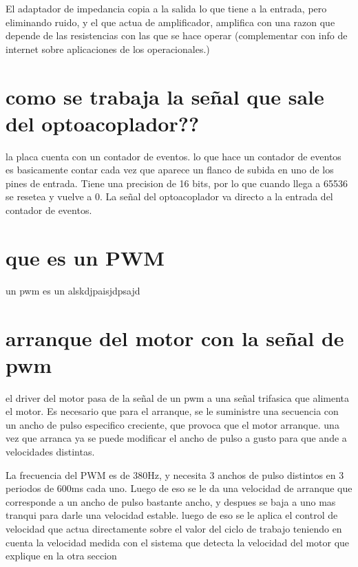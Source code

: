 \documentclass[a4paper]{article}
\begin{document}
El adaptador de impedancia copia a la salida lo que tiene a la entrada, pero eliminando ruido, y el que actua de amplificador, amplifica con una razon que depende de las resistencias con las que se hace operar (complementar con info de internet sobre aplicaciones de los operacionales.)

\section*{como se trabaja la señal que sale del optoacoplador??}
la placa cuenta con un contador de eventos. lo que hace un contador de eventos es basicamente contar cada vez que aparece un flanco de subida en uno de los pines de entrada. Tiene una precision de 16 bits, por lo que cuando llega a 65536 se resetea y vuelve a 0. La señal del optoacoplador va directo a la entrada del contador de eventos.

\section*{que es un PWM}
un pwm es un alskdjpaisjdpsajd

\section*{arranque del motor con la señal de pwm}
el driver del motor pasa de la señal de un pwm a una señal trifasica que alimenta el motor. Es necesario que para el arranque, se le suministre una secuencia con un ancho de pulso especifico creciente, que provoca que el motor arranque. una vez que arranca ya se puede modificar el ancho de pulso a gusto para que ande a velocidades distintas. 

La frecuencia del PWM es de 380Hz, y necesita 3 anchos de pulso distintos en 3 periodos de 600ms cada uno. Luego de eso se le da una velocidad de arranque que corresponde a un ancho de pulso bastante ancho, y despues se baja a uno mas tranqui para darle una velocidad estable. luego de eso se le aplica el control de velocidad que actua directamente sobre el valor del ciclo de trabajo teniendo en cuenta la velocidad medida con el sistema que detecta la velocidad del motor que explique en la otra seccion
\end{document}
